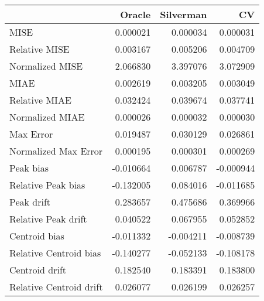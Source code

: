 \begin{tabular}{lrrr}
  \hline
 & Oracle & Silverman & CV \\ 
  \hline
MISE & 0.000021 & 0.000034 & 0.000031 \\ 
  Relative MISE & 0.003167 & 0.005206 & 0.004709 \\ 
  Normalized MISE & 2.066830 & 3.397076 & 3.072909 \\ 
  MIAE & 0.002619 & 0.003205 & 0.003049 \\ 
  Relative MIAE & 0.032424 & 0.039674 & 0.037741 \\ 
  Normalized MIAE & 0.000026 & 0.000032 & 0.000030 \\ 
  Max Error & 0.019487 & 0.030129 & 0.026861 \\ 
  Normalized Max Error & 0.000195 & 0.000301 & 0.000269 \\ 
  Peak bias & -0.010664 & 0.006787 & -0.000944 \\ 
  Relative Peak bias & -0.132005 & 0.084016 & -0.011685 \\ 
  Peak drift & 0.283657 & 0.475686 & 0.369966 \\ 
  Relative Peak drift & 0.040522 & 0.067955 & 0.052852 \\ 
  Centroid bias & -0.011332 & -0.004211 & -0.008739 \\ 
  Relative Centroid bias & -0.140277 & -0.052133 & -0.108178 \\ 
  Centroid drift & 0.182540 & 0.183391 & 0.183800 \\ 
  Relative Centroid drift & 0.026077 & 0.026199 & 0.026257 \\ 
   \hline
\end{tabular}
